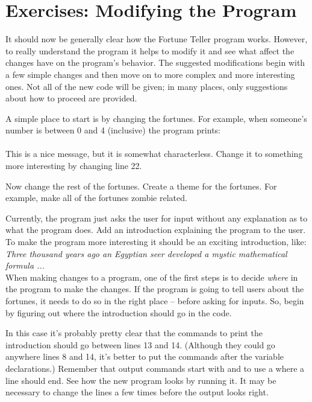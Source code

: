 \section{Exercises: Modifying the Program}
It should now be generally clear how the Fortune Teller program works.  However, to really understand the program it helps to modify it and see what affect the changes have on the program's behavior.  The suggested modifications begin with a few simple changes and then move on to more complex and more interesting ones.  Not all of the new code will be given; in many places, only suggestions about how to proceed are provided.


A simple place to start is by changing the fortunes.  For example, when someone's  number is between 0 and 4 (inclusive) the program prints:\\
 \\
This is a nice message, but it is somewhat characterless.  Change it to something more interesting by changing line 22.  

Now change the rest of the fortunes.  Create a theme for the fortunes.  For example, make all of the fortunes zombie related.  


Currently, the program just asks the user for input without any explanation as to what the program does.  Add an introduction explaining the program to the user.  To make the program more interesting it should be an exciting introduction, like:\\
\emph{Three thousand years ago an Egyptian seer developed a mystic mathematical formula ...}\\   

When making changes to a program, one of the first steps is to decide \emph{where} in the program to make the changes.
If the program is going to tell users about the fortunes, it needs to do so in the right place -- before asking for inputs.  So, begin by figuring out where the introduction should go in the code.

In this case it's probably pretty clear that the commands to print the introduction should go between lines 13 and 14.  (Although they could go anywhere lines 8 and 14, it's better to put the commands after the variable declarations.)
Remember that output commands start with  and to use a  where a line should end.  See how the new program looks by running it.  It may be necessary to change the lines a few times before the output looks right.  

